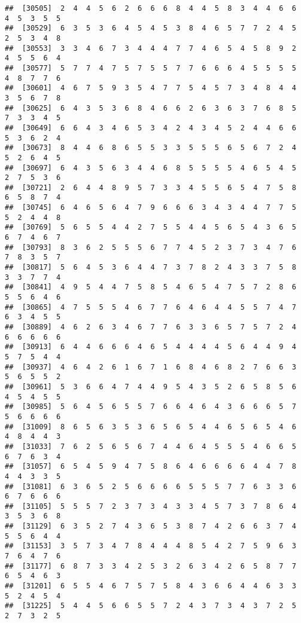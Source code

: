 \documentclass[
]{book}
\begin{document}
\begin{verbatim}
##  [30505]  2  4  4  5  6  2  6  6  6  8  4  4  5  8  3  4  4  6  6  4  5  3  5  5
##  [30529]  6  3  5  3  6  4  5  4  5  3  8  4  6  5  7  7  2  4  5  2  5  3  4  8
##  [30553]  3  3  4  6  7  3  4  4  4  7  7  4  6  5  4  5  8  9  2  4  5  5  6  4
##  [30577]  5  7  7  4  7  5  7  5  5  7  7  6  6  6  4  5  5  5  5  4  8  7  7  6
##  [30601]  4  6  7  5  9  3  5  4  7  7  5  4  5  7  3  4  8  4  4  3  5  6  7  8
##  [30625]  6  4  3  5  3  6  8  4  6  6  2  6  3  6  3  7  6  8  5  7  3  3  4  5
##  [30649]  6  6  4  3  4  6  5  3  4  2  4  3  4  5  2  4  4  6  6  5  3  6  2  4
##  [30673]  8  4  4  6  8  6  5  5  3  3  5  5  5  6  5  6  7  2  4  5  2  6  4  5
##  [30697]  6  4  3  5  6  3  4  4  6  8  5  5  5  5  4  6  5  4  5  2  7  5  3  6
##  [30721]  2  6  4  4  8  9  5  7  3  3  4  5  5  6  5  4  7  5  8  6  5  8  7  4
##  [30745]  6  4  6  5  6  4  7  9  6  6  6  3  4  3  4  4  7  7  5  5  2  4  4  8
##  [30769]  5  6  5  5  4  4  2  7  5  5  4  4  5  6  5  4  3  6  5  6  7  4  6  7
##  [30793]  8  3  6  2  5  5  5  6  7  7  4  5  2  3  7  3  4  7  6  7  8  3  5  7
##  [30817]  5  6  4  5  3  6  4  4  7  3  7  8  2  4  3  3  7  5  8  3  3  7  7  4
##  [30841]  4  9  5  4  4  7  5  8  5  4  6  5  4  7  5  7  2  8  6  5  5  6  4  6
##  [30865]  4  7  5  5  5  4  6  7  7  6  4  6  4  4  5  5  7  4  7  6  3  4  5  5
##  [30889]  4  6  2  6  3  4  6  7  7  6  3  3  6  5  7  5  7  2  4  6  6  6  6  6
##  [30913]  6  4  4  6  6  6  4  6  5  4  4  4  4  5  6  4  4  9  4  5  7  5  4  4
##  [30937]  4  6  4  2  6  1  6  7  1  6  8  4  6  8  2  7  6  6  3  5  6  5  5  2
##  [30961]  5  3  6  6  4  7  4  4  9  5  4  3  5  2  6  5  8  5  6  4  5  4  5  5
##  [30985]  5  6  4  5  6  5  5  7  6  6  4  6  4  3  6  6  6  5  7  5  6  6  6  6
##  [31009]  8  6  5  6  3  5  3  6  5  6  5  4  4  6  5  6  5  4  6  4  8  4  4  3
##  [31033]  7  6  2  5  6  5  6  7  4  4  6  4  5  5  5  4  6  6  5  6  7  6  3  4
##  [31057]  6  5  4  5  9  4  7  5  8  6  4  6  6  6  6  4  4  7  8  4  4  3  3  5
##  [31081]  6  3  6  5  2  5  6  6  6  6  5  5  5  7  7  6  3  3  6  6  7  6  6  6
##  [31105]  5  5  5  7  2  3  7  3  4  3  3  4  5  7  3  7  8  6  4  3  5  3  6  8
##  [31129]  6  3  5  2  7  4  3  6  5  3  8  7  4  2  6  6  3  7  4  5  5  6  4  4
##  [31153]  3  5  7  3  4  7  8  4  4  4  8  5  4  2  7  5  9  6  3  7  6  4  7  6
##  [31177]  6  8  7  3  3  4  2  5  3  2  6  3  4  2  6  5  8  7  7  6  5  4  6  3
##  [31201]  6  5  5  4  6  7  5  7  5  8  4  3  6  6  4  4  6  3  3  5  2  4  5  4
##  [31225]  5  4  4  5  6  6  5  5  7  2  4  3  7  3  4  3  7  2  5  2  7  3  2  5

\end{verbatim}
\end{document}
